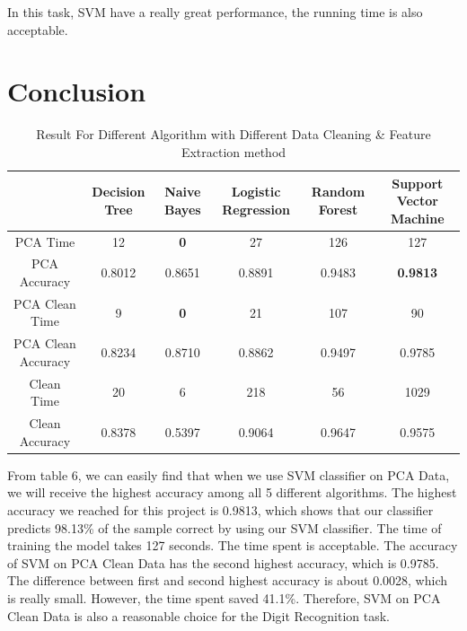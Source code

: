 \documentclass[sigconf]{acmart}
\begin{document}
In this task, SVM have a really great performance, the running time is also acceptable.

\section{Conclusion}

\begin{table}[htb]
    \centering
    \begin{tabular}{|c|c|c|c|c|c|} \hline
                           &  Decision Tree & Naive Bayes & Logistic Regression & Random Forest & Support Vector Machine \\
         \hline
        PCA Time           &  12            & \textbf{0}  & 27                  & 126           & 127                   \\
        PCA Accuracy       &  0.8012        & 0.8651      & 0.8891              & 0.9483        & \textbf{0.9813}       \\
        PCA Clean Time     &  9             & \textbf{0}  & 21                  & 107           & 90                    \\
        PCA Clean Accuracy &  0.8234        & 0.8710      & 0.8862              & 0.9497        & 0.9785                \\
        Clean Time         &  20            & 6           & 218                 & 56            & 1029                  \\
        Clean Accuracy     &  0.8378        & 0.5397      & 0.9064              & 0.9647        & 0.9575                \\ \hline
    \end{tabular}
    \caption{Result For Different Algorithm with Different Data Cleaning \& Feature Extraction method}
\end{table}

From table 6, we can easily find that when we use SVM classifier on PCA Data, we will receive the highest accuracy among all 5 different algorithms. The highest accuracy we reached for this project is 0.9813, which shows that our classifier predicts 98.13\% of the sample correct by using our SVM classifier. The time of training the model takes 127 seconds. The time spent is acceptable. The accuracy of SVM on PCA Clean Data has the second highest accuracy, which is 0.9785. The difference between first and second highest accuracy is about 0.0028, which is really small. However, the time spent saved 41.1\%. Therefore, SVM on PCA Clean Data is also a reasonable choice for the Digit Recognition task.
\end{document}
